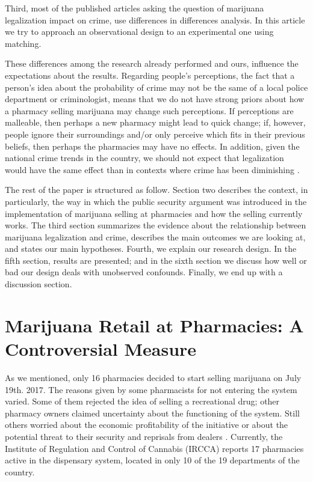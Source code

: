 \documentclass[11pt]{article}
\begin{document}
Third, most of the published articles asking the question of marijuana legalization impact on crime, use differences in differences analysis. In this article we try to approach an observational design to an experimental one using matching. 

These differences among the research already performed and ours, influence the expectations about the results. Regarding people's perceptions, the fact that a person's idea about the probability of crime may not be the same of a local police department or criminologist, means that we do not have strong priors about how a pharmacy selling marijuana may change such perceptions. If perceptions are malleable, then perhaps a new pharmacy might lead to quick change; if, however, people ignore their surroundings and/or only perceive which fits in their previous beliefs, then perhaps the pharmacies may have no effects. In addition, given the national crime trends in the country, we should not expect that legalization would have the same effect than in contexts where crime has been diminishing \citep{eisner2016achieving}.

The rest of the paper is structured as follow. Section two describes the context, in particularly, the way in which the public security argument was introduced in the implementation of marijuana selling at pharmacies and how the selling currently works. The third section summarizes the evidence about the relationship between marijuana legalization and crime, describes the main outcomes we are looking at, and states our main hypotheses. Fourth, we explain our research design. In the fifth section, results are presented; and in the  sixth section we discuss how well or bad our design deals with unobserved confounds. Finally, we end up with a discussion section.

\section{Marijuana Retail at Pharmacies: A Controversial Measure}
As we mentioned, only 16 pharmacies decided to start selling marijuana on July 19th. 2017. The reasons given by some pharmacists for not entering the system varied. Some of them rejected the idea of selling a recreational drug; other pharmacy owners claimed uncertainty about the functioning of the system. Still others worried about the economic profitability of the initiative or about the potential threat to their security and reprisals from dealers \citep{boidi2016}. Currently, the Institute of Regulation and Control of Cannabis (IRCCA) reports 17 pharmacies active in the dispensary system, located in only 10 of the 19 departments of the country.
\end{document}
